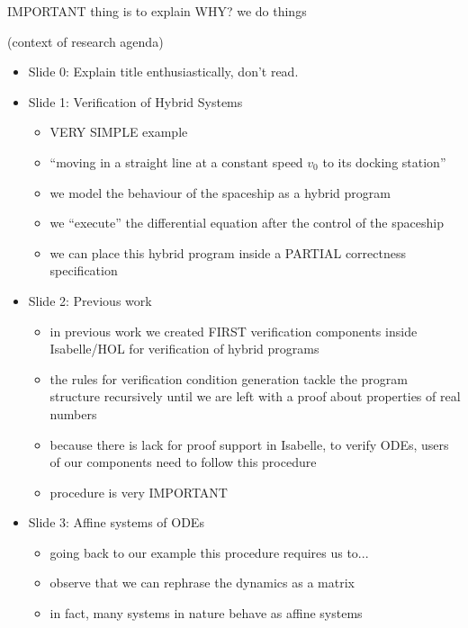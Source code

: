 \documentclass[english,letterpaper,12pt]{article}
\begin{document}
%
%
%


IMPORTANT thing is to explain WHY? we do things

(context of research agenda)

\begin{itemize}
\item Slide 0: Explain title enthusiastically, don't read. 
\item Slide 1: Verification of Hybrid Systems
\begin{itemize}
\item VERY SIMPLE example
\item ``moving in a straight line at a constant speed $v_0$ to its docking station''
\item we model the behaviour of the spaceship as a hybrid program
\item we ``execute'' the differential equation after the control of the spaceship
\item we can place this hybrid program inside a PARTIAL correctness specification
\end{itemize}
\item Slide 2: Previous work
\begin{itemize}
\item in previous work we created FIRST verification components inside Isabelle/HOL for verification of hybrid programs
\item the rules for verification condition generation tackle the program structure recursively until we are left with a proof about properties of real numbers
\item because there is lack for proof support in Isabelle, to verify ODEs, users of our components need to follow this procedure
\item procedure is very IMPORTANT
\end{itemize}
\item Slide 3: Affine systems of ODEs
\begin{itemize}
\item going back to our example this procedure requires us to...
\item observe that we can rephrase the dynamics as a matrix
\item in fact, many systems in nature behave as affine systems

\end{itemize}
\end{itemize}
\end{document}
